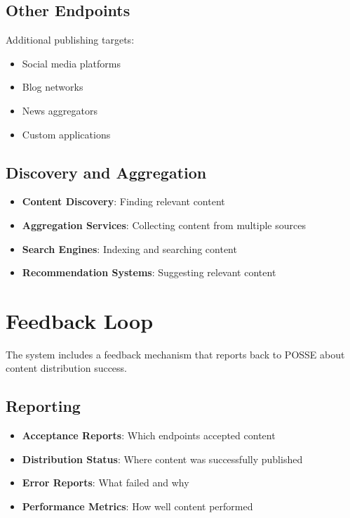 \documentclass[11pt]{article}
\begin{document}
\subsection{Other Endpoints}

Additional publishing targets:
\begin{itemize}
    \item Social media platforms
    \item Blog networks
    \item News aggregators
    \item Custom applications
\end{itemize}

\subsection{Discovery and Aggregation}

\begin{itemize}
    \item \textbf{Content Discovery}: Finding relevant content
    \item \textbf{Aggregation Services}: Collecting content from multiple sources
    \item \textbf{Search Engines}: Indexing and searching content
    \item \textbf{Recommendation Systems}: Suggesting relevant content
\end{itemize}

\section{Feedback Loop}

The system includes a feedback mechanism that reports back to POSSE about content distribution success.

\subsection{Reporting}

\begin{itemize}
    \item \textbf{Acceptance Reports}: Which endpoints accepted content
    \item \textbf{Distribution Status}: Where content was successfully published
    \item \textbf{Error Reports}: What failed and why
    \item \textbf{Performance Metrics}: How well content performed
\end{itemize}
\end{document}
